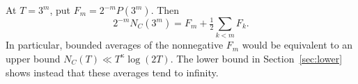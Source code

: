 At \(T=3^m\), put \(F_m=2^{-m}P(3^m)\). Then
\begin{equation}\label{eq:normalized-preperiod}
  2^{-m}N_C(3^m)=F_m+\tfrac12\sum_{k<m}F_k.
\end{equation}
In particular, bounded averages of the nonnegative \(F_m\) would be
equivalent to an upper bound \(N_C(T)\ll T^\kappa\log(2T)\).
The lower bound in Section~\ref{sec:lower} shows instead that these
averages tend to infinity.
